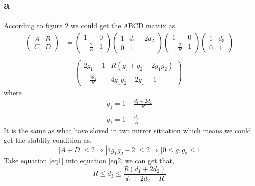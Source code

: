 \documentclass{article}
\begin{document}
\subsection{a}
According to figure 2 we could get the ABCD matrix as,
\begin{equation}
	\begin{aligned}
	\begin{pmatrix}
	A & B\\
	C & D 
	\end{pmatrix}
	&=\begin{pmatrix}
	1 & 0\\
	-\frac{2}{R} & 1
	\end{pmatrix}
	\begin{pmatrix}
	1 & d_1+2d_2\\
	0 & 1
	\end{pmatrix}
	\begin{pmatrix}
	1 & 0\\
	-\frac{2}{R} & 1
	\end{pmatrix}
	\begin{pmatrix}
	1 & d_3\\
	0 & 1
	\end{pmatrix}\\
	\\
	&=\begin{pmatrix}
	2g_1-1 & R(g_1+g_2-2g_1g_2)\\
	-\frac{4g_1}{R} & 4g_1g_2-2g_1-1
	\end{pmatrix}
	\end{aligned}
\end{equation}
where 
\begin{equation}\label{eq1}
\begin{array}{l}
g_1=1-\frac{d_1+2d_2}{R}\\
\\
g_2=1-\frac{d_3}{R}
\end{array}
\end{equation}
It is the same as what have sloved in two mirror situation  which means we could get the stablity condition as,
\begin{equation}\label{eq2}
|A+D|\leq2\Rightarrow|4g_1g_2-2|\leq2\Rightarrow|0\leq g_1g_2\leq 1
\end{equation}
Take equation \ref{eq1} into equation \ref{eq2} we can get that,
\begin{equation}\label{eq3}
	R \leq d_3 \leq \frac{R(d_1+2d_2)}{d_1+2d_2-R}
\end{equation}
\end{document}
